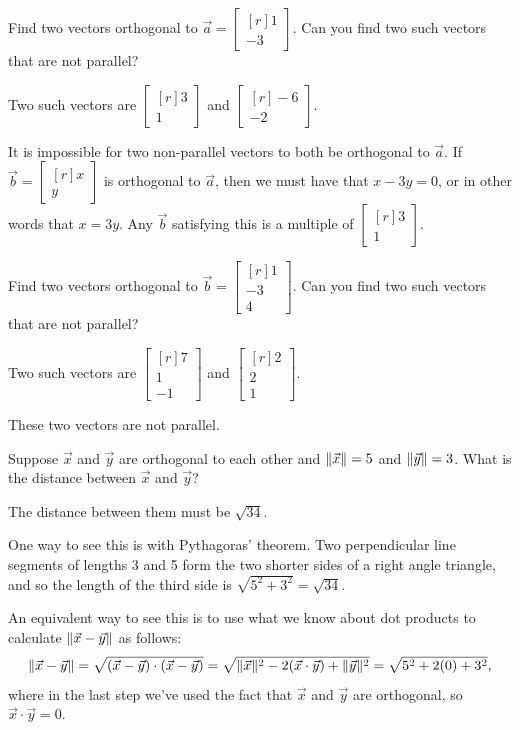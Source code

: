 \documentclass{problemset}
\newcommand{\mat}[1]{\begin{bmatrix*}[r]#1\end{bmatrix*}}
\DeclarePairedDelimiter\norm{\lVert}{\rVert}
\begin{document}
	\begin{parts}
		\item Find two vectors orthogonal to $\vec a=\mat{1\\-3}$.  Can you find
			two such vectors that are not parallel?
			\begin{solution}
				Two such vectors are $\mat{3\\1}$ and $\mat{-6\\-2}$.

				It is impossible for two non-parallel vectors to both be
				orthogonal to $\vec a$. If $\vec b = \mat{x\\y}$ is orthogonal to
				$\vec a$, then we must have that $x - 3y = 0$, or in other words
				that $x = 3y$. Any $\vec b$ satisfying this is a multiple of
				$\mat{3\\1}$.
			\end{solution}
		\item Find two vectors orthogonal to $\vec b=\mat{1\\-3\\4}$.  Can you
			find two such vectors that are not parallel?
			\begin{solution}
				Two such vectors are $\mat{7\\1\\-1}$ and $\mat{2\\2\\1}$.

				These two vectors are not parallel.
			\end{solution}
		\item Suppose $\vec x$ and $\vec y$ are orthogonal to each other and
			$\norm{\vec x}=5$ and $\norm{\vec y}=3$. What is the distance between
			$\vec x$ and $\vec y$?
			\begin{solution}
				The distance between them must be $\sqrt{34}$.

				One way to see this is with Pythagoras' theorem. Two perpendicular
				line segments of lengths 3 and 5 form the two shorter sides of a
				right angle triangle, and so the length of the third side is
				$\sqrt{5^2 + 3^2} = \sqrt{34}$.

				An equivalent way to see this is to use what we know about dot
				products to calculate $\norm{\vec x-\vec y}$ as follows:
				\[
					\norm{\vec x-\vec y} = \sqrt{(\vec x-\vec y)\cdot(\vec x-\vec y)}
					= \sqrt{\norm{\vec x}^2 - 2(\vec x\cdot\vec y) + \norm{\vec y}^2}
					= \sqrt{5^2 + 2(0) + 3^2},
				\]
				where in the last step we've used the fact that $\vec x$ and $\vec y$
				are orthogonal, so $\vec x\cdot\vec y = 0$.
			\end{solution}
	\end{parts}
\end{document}

